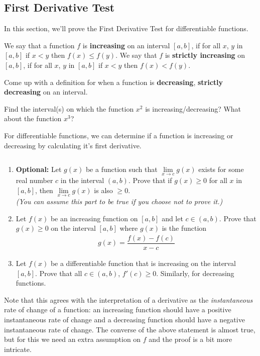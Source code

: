 \subsection{First Derivative Test}
In this section, we'll prove the First Derivative Test for differentiable functions.

\begin{definition}
	We say that a function $f$ is {\bf increasing} on an interval $[a,b]$, if for all $x$, $y$ in $[a,b]$ if $x < y$ then $f(x) \le f(y)$.
		We say that $f$ is {\bf strictly increasing} on $[a,b]$, if for all $x$, $y$ in $[a,b]$ if $x < y$ then $f(x) < f(y)$.
\end{definition}
\begin{exercise}
	Come up with a definition for when a function is {\bf decreasing}, {\bf strictly decreasing} on an interval.
\end{exercise}
\begin{exercise}
	Find the interval(s) on which the function $x^2$ is increasing/decreasing? What about the function $x^3$?
\end{exercise}

For differentiable functions, we can determine if a function is increasing or decreasing by calculating it's first derivative.
\begin{exercise}$ $
	\label{q:increasing_decreasing_derivative}
	\begin{enumerate}
		\item {\bf Optional:} Let $g(x)$ be a function such that $\lim \limits_{x\rightarrow c} g(x)$ exists for some real number $c$ in the interval $(a,b)$. Prove that if $g(x) \ge 0$ for all $x$ in $[a,b]$, then $\lim \limits_{x\rightarrow c} g(x)$ is also $\ge 0$.\\ {\it (You can assume this part to be true if you choose not to prove it.)}
		\item Let $f(x)$ be an increasing function on $[a,b]$ and let $c \in (a,b)$. Prove that $g(x) \ge 0$ on the interval $[a,b]$ where $g(x)$ is the function
		      \begin{align*}
			      g(x) = \dfrac{f(x) - f(c)}{x - c}
		      \end{align*}
		\item Let $f(x)$ be a differentiable function that is increasing on the interval $[a,b]$. Prove that all $c \in (a,b)$, $f'(c) \ge 0$. Similarly, for decreasing functions.
	\end{enumerate}
\end{exercise}
Note that this agrees with the interpretation of a derivative as the {\it instantaneous} rate of change of a function: an increasing function should have a positive {instantaneous} rate of change and a decreasing function should have a negative {instantaneous} rate of change. The converse of the above statement is almost true, but for this we need an extra assumption on $f$ and the proof is a bit more intricate.

